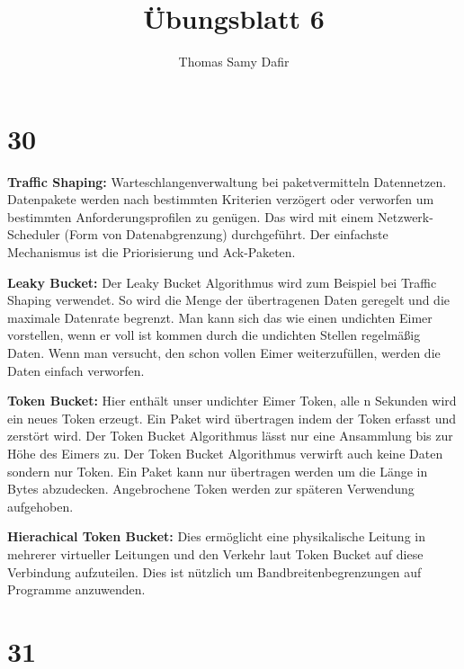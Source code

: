 \documentclass[12pt, a4paper]{article}
\title{Übungsblatt 6}
\author{Thomas Samy Dafir}
\date{}
\begin{document}
	
\section*{30}
\textbf{Traffic Shaping:}
Warteschlangenverwaltung bei paketvermitteln Datennetzen.  Datenpakete werden nach bestimmten Kriterien verzögert oder verworfen um bestimmten Anforderungsprofilen zu genügen. Das wird mit einem Netzwerk-Scheduler  (Form von Datenabgrenzung) durchgeführt. 
Der einfachste Mechanismus ist die Priorisierung und Ack-Paketen.


\textbf{Leaky Bucket:}
Der Leaky Bucket Algorithmus wird zum Beispiel bei  Traffic Shaping verwendet. So wird die Menge der übertragenen Daten geregelt und die maximale Datenrate begrenzt. 
Man kann sich das wie einen undichten Eimer vorstellen, wenn er voll ist kommen durch die  undichten Stellen regelmäßig Daten. Wenn man versucht, den schon vollen Eimer weiterzufüllen, werden die Daten einfach verworfen. 


\textbf{Token Bucket:}
Hier enthält unser undichter Eimer Token, alle n Sekunden wird ein neues Token erzeugt. Ein Paket wird übertragen indem der Token erfasst und zerstört wird.  Der Token Bucket Algorithmus lässt nur eine Ansammlung bis zur Höhe des Eimers zu. Der Token Bucket Algorithmus verwirft auch keine Daten sondern nur Token. Ein Paket kann nur übertragen werden um die Länge in Bytes abzudecken.  Angebrochene Token werden zur späteren Verwendung aufgehoben. 


\textbf{Hierachical Token Bucket:}
Dies ermöglicht eine physikalische Leitung in mehrerer virtueller Leitungen und den Verkehr laut Token Bucket auf diese Verbindung aufzuteilen. 
Dies ist nützlich um Bandbreitenbegrenzungen auf Programme anzuwenden.


\section*{31}
\end{document}
